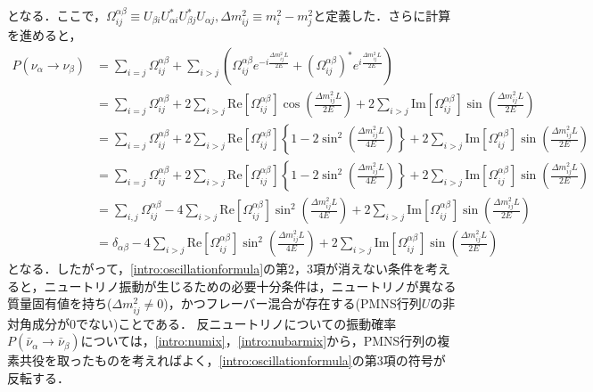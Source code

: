 \documentclass[../../main.tex]{subfiles}
\begin{document}
となる．ここで，$\Omega^{\alpha\beta}_{ij}\equiv U_{\beta i}U^{*}_{\alpha i}U^{*}_{\beta j}U_{\alpha j},\Delta m_{ij}^{2}\equiv m_{i}^{2}-m_{j}^{2}$と定義した．さらに計算を進めると，
\begin{align}
  \label{intro:oscillationformula}
  P\left(\nu_{\alpha}\rightarrow\nu_{\beta}\right)
  &=\sum_{i=j}\Omega^{\alpha\beta}_{ij}+\sum_{i>j}\left(\Omega^{\alpha\beta}_{ij}e^{-i\frac{\Delta m_{ij}^{2}L}{2E}}+\left(\Omega^{\alpha\beta}_{ij}\right)^{*}e^{i\frac{\Delta m_{ij}^{2}L}{2E}}\right)\nonumber\\
  &=\sum_{i=j}\Omega^{\alpha\beta}_{ij}+2\sum_{i>j}\mathrm{Re}\left[\Omega^{\alpha\beta}_{ij}\right]\cos\left(\frac{\Delta m_{ij}^{2}L}{2E}\right)+2\sum_{i>j}\mathrm{Im}\left[\Omega^{\alpha\beta}_{ij}\right]\sin\left(\frac{\Delta m_{ij}^{2}L}{2E}\right)\nonumber\\
  &=\sum_{i=j}\Omega^{\alpha\beta}_{ij}+2\sum_{i>j}\mathrm{Re}\left[\Omega^{\alpha\beta}_{ij}\right]\left\{1-2\sin^{2}\left(\frac{\Delta m_{ij}^{2}L}{4E}\right)\right\}+2\sum_{i>j}\mathrm{Im}\left[\Omega^{\alpha\beta}_{ij}\right]\sin\left(\frac{\Delta m_{ij}^{2}L}{2E}\right)\nonumber\\
  &=\sum_{i=j}\Omega^{\alpha\beta}_{ij}+2\sum_{i>j}\mathrm{Re}\left[\Omega^{\alpha\beta}_{ij}\right]\left\{1-2\sin^{2}\left(\frac{\Delta m_{ij}^{2}L}{4E}\right)\right\}+2\sum_{i>j}\mathrm{Im}\left[\Omega^{\alpha\beta}_{ij}\right]\sin\left(\frac{\Delta m_{ij}^{2}L}{2E}\right)\nonumber\\
  &=\sum_{i,j}\Omega^{\alpha\beta}_{ij}-4\sum_{i>j}\mathrm{Re}\left[\Omega^{\alpha\beta}_{ij}\right]\sin^{2}\left(\frac{\Delta m_{ij}^{2}L}{4E}\right)+2\sum_{i>j}\mathrm{Im}\left[\Omega^{\alpha\beta}_{ij}\right]\sin\left(\frac{\Delta m_{ij}^{2}L}{2E}\right)\nonumber\\
  &=\delta_{\alpha\beta}-4\sum_{i>j}\mathrm{Re}\left[\Omega^{\alpha\beta}_{ij}\right]\sin^{2}\left(\frac{\Delta m_{ij}^{2}L}{4E}\right)+2\sum_{i>j}\mathrm{Im}\left[\Omega^{\alpha\beta}_{ij}\right]\sin\left(\frac{\Delta m_{ij}^{2}L}{2E}\right)
\end{align}
となる．したがって，\eqref{intro:oscillationformula}の第2，3項が消えない条件を考えると，ニュートリノ振動が生じるための必要十分条件は，ニュートリノが異なる質量固有値を持ち($\Delta m_{ij}^{2}\neq0$)，かつフレーバー混合が存在する(PMNS行列$U$の非対角成分が0でない)ことである．
反ニュートリノについての振動確率$P\left(\bar{\nu}_{\alpha}\rightarrow\bar{\nu}_{\beta}\right)$については，\eqref{intro:numix}，\eqref{intro:nubarmix}から，PMNS行列の複素共役を取ったものを考えればよく，\eqref{intro:oscillationformula}の第3項の符号が反転する．
\end{document}
